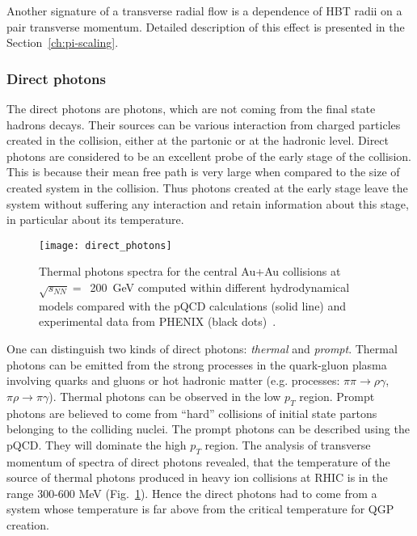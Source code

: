         Another signature of a transverse radial flow is a dependence of HBT radii on a pair transverse momentum.
        Detailed description of this effect is presented in the Section~\ref{ch:pi-scaling}.
      \subsubsection{Direct photons}
        The direct photons are photons, which are not coming from the final state hadrons decays.
        Their sources can be various interaction from charged particles created in the collision, either at the partonic or at the hadronic level.
        Direct photons are considered to be an excellent probe of the early stage of the collision.
        This is because their mean free path is very large when compared to the size of created system in the collision.
        Thus photons created at the early stage leave the system without suffering any interaction and retain information about this stage, in particular about its temperature.

        \begin{figure}[b]
          \centering
          \texttt{[image: direct\_photons]}
          \caption{Thermal photons spectra for the central Au+Au collisions at $\sqrt{s_{NN}}=$~200~GeV computed within different hydrodynamical models compared with the pQCD calculations (solid line) and experimental data from PHENIX (black dots)~\cite{rapp_xu}.}
          \label{fig:direct_photons}
        \end{figure}
        One can distinguish two kinds of direct photons: \textit{thermal} and \textit{prompt}.
        Thermal photons can be emitted from the strong processes in the quark-gluon plasma involving quarks and gluons or hot hadronic matter (e.g. processes: $\pi\pi \to \rho \gamma$, $\pi\rho \to \pi \gamma$).
        Thermal photons can be observed in the low $p_T$ region.
        Prompt photons are believed to come from ``hard'' collisions of initial state partons belonging to the colliding nuclei.
        The prompt photons can be described using the pQCD.
        They will dominate the high $p_T$ region.
        The analysis of transverse momentum of spectra of direct photons revealed, that the temperature of the source of thermal photons produced in heavy ion collisions at RHIC is in the range 300-600 MeV (Fig.~\ref{fig:direct_photons}).
        Hence the direct photons had to come from a system whose temperature is far above from the critical temperature for QGP creation.

